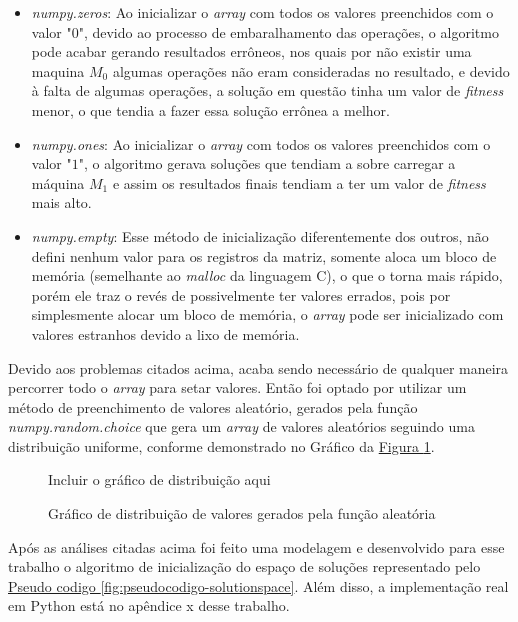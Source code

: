 \begin{itemize}
    \item \textit{numpy.zeros}: Ao inicializar o \textit{array} com todos os valores preenchidos com o valor "$0$", devido ao processo de embaralhamento das operações, o algoritmo pode acabar gerando resultados errôneos, nos quais por não existir uma maquina $M_0$ algumas operações não eram consideradas no resultado, e devido à falta de algumas operações, a solução em questão tinha um valor de \textit{fitness} menor, o que tendia a fazer essa solução errônea a melhor.

    \item \textit{numpy.ones}: Ao inicializar o \textit{array} com todos os valores preenchidos com o valor "$1$", o algoritmo gerava soluções que tendiam a sobre carregar a máquina $M_1$ e assim os resultados finais tendiam a ter um valor de \textit{fitness} mais alto.

    \item \textit{numpy.empty}: Esse método de inicialização diferentemente dos outros, não defini nenhum valor para os registros da matriz, somente aloca um bloco de memória (semelhante ao \textit{malloc} da linguagem C), o que o torna mais rápido, porém ele traz o revés de possivelmente ter valores errados, pois por simplesmente alocar um bloco de memória, o \textit{array} pode ser inicializado com valores estranhos devido a lixo de memória.
\end{itemize}

\noindent Devido aos problemas citados acima, acaba sendo necessário de qualquer maneira percorrer todo o \textit{array} para setar valores. \newline 
Então foi optado por utilizar um método de preenchimento de valores aleatório, 
gerados pela função \textit{numpy.random.choice} que gera um \textit{array} de valores aleatórios seguindo uma distribuição uniforme, 
conforme demonstrado no Gráfico da \hyperref[fig:distrib-uniforme]{Figura \ref{fig:distrib-uniforme}}.

\begin{figure}[ht]
    \centering
    \small{Incluir o gráfico de distribuição aqui}
    \caption{Gráfico de distribuição de valores gerados pela função aleatória}
    \label{fig:distrib-uniforme}
\end{figure}

%

Após as análises citadas acima foi feito uma modelagem e desenvolvido para esse trabalho o algoritmo de inicialização do espaço de soluções representado pelo 
\hyperref[fig:pseudocodigo-solutionspace]{Pseudo codigo \ref{fig:pseudocodigo-solutionspace}}. 
Além disso, a implementação real em Python está no apêndice x desse trabalho.\hfill

